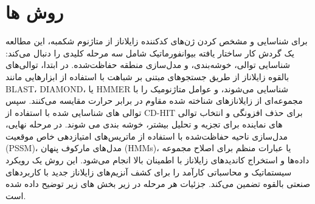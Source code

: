    \section{روش ها}
        برای شناسایی و مشخص کردن ژن‌های کدکننده زایلاناز از متاژنوم شکمبه، این مطالعه یک گردش کار ساختار یافته بیوانفورماتیک شامل سه مرحله کلیدی را دنبال می‌کند: شناسایی توالی، خوشه‌بندی، و مدل‌سازی منطقه حفاظت‌شده. در ابتدا، توالی‌های بالقوه زایلاناز از طریق جستجوهای مبتنی بر شباهت با استفاده از ابزارهایی مانند BLAST، DIAMOND، یا HMMER شناسایی می‌شوند، و عوامل متاژنومیک را با مجموعه‌ای از زایلانازهای شناخته شده مقاوم در برابر حرارت مقایسه می‌کنند. سپس توالی های شناسایی شده با استفاده از CD-HIT برای حذف افزونگی و انتخاب توالی های نماینده برای تجزیه و تحلیل بیشتر، خوشه بندی می شوند. در مرحله نهایی، مدل‌سازی ناحیه حفاظت‌شده با استفاده از ماتریس‌های امتیازدهی خاص موقعیت (PSSM)، مدل‌های مارکوف پنهان (HMMs)، یا عبارات منظم برای اصلاح مجموعه داده‌ها و استخراج کاندیدهای زایلاناز با اطمینان بالا انجام می‌شود. این روش یک رویکرد سیستماتیک و محاسباتی کارآمد را برای کشف آنزیم‌های زایلاناز جدید با کاربردهای صنعتی بالقوه تضمین می‌کند. جزئیات هر مرحله در زیر بخش های زیر توضیح داده شده است.
